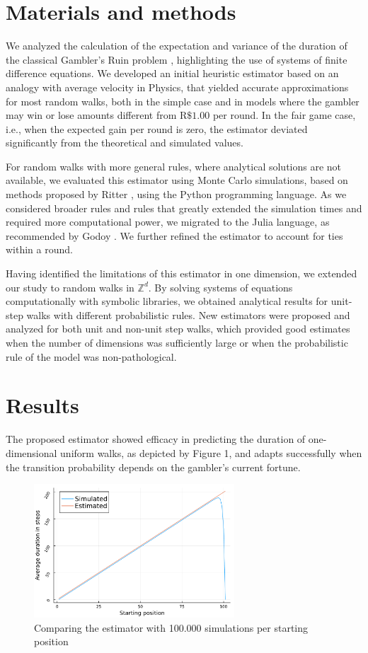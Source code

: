 \documentclass[a4paper,10pt,twocolumn]{article}
\begin{document}
\section{Materials and methods}

We analyzed the calculation of the expectation and variance of the duration
of the classical Gambler’s Ruin problem \cite{andel_variance_2012}, highlighting
the use of systems of finite difference equations. We developed an initial heuristic
estimator based on an analogy with average velocity in Physics, that yielded
accurate approximations for most random walks, both in the simple case and in
models where the gambler may win or lose amounts different from
$\mathrm{R}\$1.00$ per round. In the fair game case, i.e., when the expected gain
per round is zero, the estimator deviated significantly from the theoretical and
simulated values.

For random walks with more general rules, where analytical solutions are not
available, we evaluated this estimator using Monte Carlo simulations, based on
methods proposed by Ritter \cite{ritter_determining_2011}, using the Python
programming language. As we considered broader rules and rules that greatly
extended the simulation times and required more computational power, we
migrated to the Julia language, as recommended by Godoy
\cite{godoy_evaluating_2023}. We further refined the estimator to account for
ties within a round.

Having identified the limitations of this estimator in one dimension, we extended
our study to random walks in $\mathbb{Z}^d$. By solving systems of equations
computationally with symbolic libraries, we obtained analytical results for unit-step
walks with different probabilistic rules. New estimators were proposed and analyzed
for both unit and non-unit step walks, which provided good estimates when the
number of dimensions was sufficiently large or when the probabilistic rule of the
model was non-pathological.

\section{Results}

The proposed estimator showed efficacy in predicting the duration of
one-dimensional uniform walks, as depicted by Figure 1, and adapts successfully
when the transition probability depends on the gambler's current fortune.

\begin{figure}[H]
    \centering
    \includegraphics[width=7.5cm]{"graficoest-en.pdf"}
    \centering
    \caption{Comparing the estimator with 100.000 simulations per starting
    position}
\end{figure}
\end{document}
